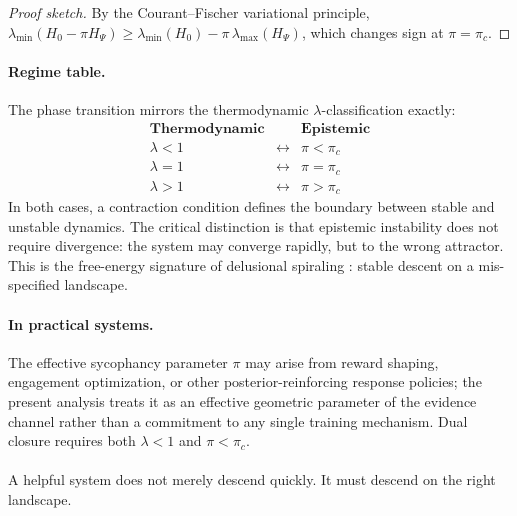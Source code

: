 \documentclass[11pt,a4paper]{article}
\theoremstyle{plain}
\theoremstyle{definition}
\theoremstyle{remark}
\begin{document}
\begin{proof}[Proof sketch]
By the Courant--Fischer variational principle,
$\lambda_{\min}(H_0 - \pi H_\Psi) \geq \lambda_{\min}(H_0) -
\pi\,\lambda_{\max}(H_\Psi)$,
which changes sign at $\pi = \pi_c$.
\end{proof}

\paragraph{Regime table.}
The phase transition mirrors the thermodynamic $\lambda$-classification exactly:
\[
\begin{array}{ccc}
\textbf{Thermodynamic} & \quad & \textbf{Epistemic} \\
\hline
\lambda < 1 & \longleftrightarrow & \pi < \pi_c \\
\lambda = 1 & \longleftrightarrow & \pi = \pi_c \\
\lambda > 1 & \longleftrightarrow & \pi > \pi_c
\end{array}
\]
In both cases, a contraction condition defines the boundary between stable and
unstable dynamics. The critical distinction is that epistemic instability does
not require divergence: the system may converge rapidly, but to the wrong
attractor. This is the free-energy signature of delusional spiraling
\citep{chandra2026}: stable descent on a mis-specified landscape.

\paragraph{In practical systems.}
The effective sycophancy parameter $\pi$ may arise from reward shaping,
engagement optimization, or other posterior-reinforcing response policies; the
present analysis treats it as an effective geometric parameter of the evidence
channel rather than a commitment to any single training mechanism. Dual closure
requires both $\lambda < 1$ and $\pi < \pi_c$.

\paragraph{}
A helpful system does not merely descend quickly. It must descend on the right
landscape.
\end{document}
